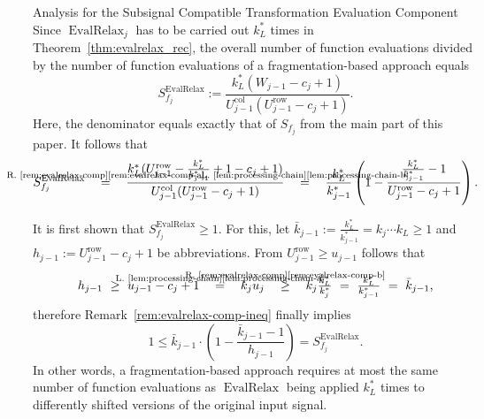 \documentclass[journal]{IEEEtran}
\makeatletter
\def\subsubsection{\@startsection{subsubsection} {3} {\z@} {1.5ex plus 1.5ex minus 0.5ex} {0.7ex plus .5ex minus 0ex} {\normalfont\normalsize\itshape}}
\newcommand{\row}{\operatorname{row}}
\newcommand{\col}{\operatorname{col}}
\newcommand{\equsing}[1]{\overset{\mathclap{\text{#1}}}{=}}
\newcommand{\gequsing}[1]{\overset{\mathclap{\text{#1}}}{\geq}}
\DeclareMathOperator{\EvalRelax}{EvalRelax}
\makeatother
\begin{document}
\subsubsection{Analysis for the Subsignal Compatible Transformation Evaluation Component}
Since $\EvalRelax_j$ has to be carried out $k_L^*$ times in Theorem~\ref{thm:evalrelax_rec}, the overall number of function evaluations divided by the number of function evaluations of a fragmentation-based approach equals
\begin{displaymath}
  S_{f_j}^{\EvalRelax} := \frac{k_L^*(W_{j - 1} - c_j + 1)}{U_{j - 1}^{\col} (U_{j - 1}^{\row} - c_j + 1)}\text{.}
\end{displaymath}
Here, the denominator equals exactly that of $S_{f_j}$ from the main part of this paper.
It follows that
\begin{displaymath}
  S_{f_j}^{\EvalRelax}
  \ \ \ \equsing{R.~\ref{rem:evalrelax-comp}\ref{rem:evalrelax-comp-a}}\ \ \ \frac{k_L^*(U_{j - 1}^{\row} - \frac{k_L^*}{k_{j - 1}^*} + 1 - c_j + 1)}{U_{j - 1}^{\col} (U_{j - 1}^{\row} - c_j + 1)}
  \ \ \ \equsing{L.~\ref{lem:processing-chain}\ref{lem:processing-chain-b}}\ \ \ \frac{k_L^*}{k_{j - 1}^*}\left(1 - \frac{\tfrac{k_L^*}{k_{j - 1}^*} - 1}{U_{j - 1}^{\row} - c_j + 1}\right)\text{.}
\end{displaymath}

It is first shown that $S_{f_j}^{\EvalRelax} \geq 1$.
For this, let $\bar{k}_{j - 1} := \frac{k_L^*}{k_{j - 1}^*} = k_j\cdots k_L \geq 1$ and $h_{j - 1} := U_{j - 1}^{\row} - c_j + 1$ be abbreviations.
From $U_{j - 1}^{\row} \geq u_{j - 1}$ follows that
\begin{displaymath}
  h_{j - 1}
  \ \geq\ u_{j - 1} - c_j + 1
  \ \ \ \equsing{L.~\ref{lem:processing-chain}\ref{lem:processing-chain-a}}\ \ \ k_j u_j
  \ \ \ \gequsing{R.~\ref{rem:evalrelax-comp}\ref{rem:evalrelax-comp-b}}\ \ \ k_j \tfrac{k_L^*}{k_j^*}
  \ =\ \tfrac{k_L^*}{k_{j - 1}^*}
  \ =\ \bar{k}_{j - 1}\text{,}
\end{displaymath}
therefore Remark~\ref{rem:evalrelax-comp-ineq} finally implies
\begin{displaymath}
  1 \leq \bar{k}_{j - 1}\cdot\left(1 - \frac{\bar{k}_{j - 1} - 1}{h_{j - 1}}\right) = S_{f_j}^{\EvalRelax}\text{.}
\end{displaymath}
In other words, a fragmentation-based approach requires at most the same number of function evaluations as $\EvalRelax$ being applied $k_L^*$ times to differently shifted versions of the original input signal.
\end{document}
